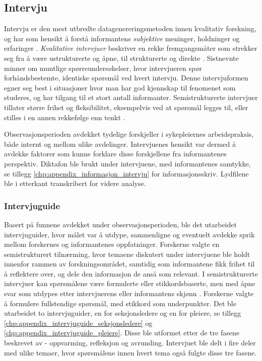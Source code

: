 \subsection{Intervju}
\label{sec:intervju}
 
Intervju er den mest utbredte datagenereringsmetoden innen kvalitativ forskning, og har som hensikt å forstå informantens \textit{subjektive} meninger, holdninger og erfaringer \citep{Tjora}. \textit{Kvalitative intervjuer} beskriver en rekke fremgangsmåter som strekker seg fra å være ustrukturerte og åpne, til strukturerte og direkte \citep{Smith12}. Sistnevnte minner om muntlige spørreundersøkelser, hvor intervjueren spør forhåndsbestemte, identiske spørsmål ved hvert intervju. Denne intervjuformen egner seg best i situasjoner hvor man har god kjennskap til fenomenet som studeres, og har tilgang til et stort antall informanter. Semistrukturerte intervjuer tillater større frihet og fleksibilitet, eksempelvis ved at spørsmål legges til, eller stilles i en annen rekkefølge enn tenkt \citep{Tjora}.
 
\noindent
Observasjonsperioden avdekket tydelige forskjeller i sykepleiernes arbeidspraksis, både internt og mellom ulike avdelinger. Intervjuenes hensikt var dermed å avdekke faktorer som kunne forklare disse forskjellene fra informantenes perspektiv. Diktafon ble brukt under intervjuene, med informantenes samtykke, se tillegg \ref{chp:appendix_informasjon_intervju} for informasjonsskriv. Lydfilene ble i etterkant transkribert for videre analyse.
 
\subsubsection{Intervjuguide}
Basert på funnene avdekket under observasjonsperioden, ble det utarbeidet intervjuguider, hvor målet var å utdype, sammenligne og eventuelt avdekke sprik mellom forskernes og informantenes oppfatninger. Forskerne valgte en semistrukturert tilnærming, hvor temaene diskutert under intervjuene ble holdt innenfor rammen av forskningsområdet, samtidig som informantene fikk frihet til å reflektere over, og dele den informasjon de anså som relevant.
I semistrukturerte intervjuer kan spørsmålene være formulerte eller stikkordsbaserte, men med åpne svar som utdypes etter intervjuerens eller informantens skjønn \citep{Schensul99}. Forskerne valgte å formulere fullstendige spørsmål, med stikkord som underpunkter. Det ble utarbeidet to intervjuguider, en for seksjonsledere og en for pleiere, se tillegg \ref{chp:appendix_intervjuguide_seksjonsledere} og \ref{chp:appendix_intervjuguide_pleiere}. Disse ble utformet etter de tre fasene beskrevet av \citet{Tjora} - oppvarming, refleksjon og avrunding. Intervjuet ble delt i fire deler med ulike temaer, hvor spørsmålene innen hvert tema også fulgte disse tre fasene.
 
